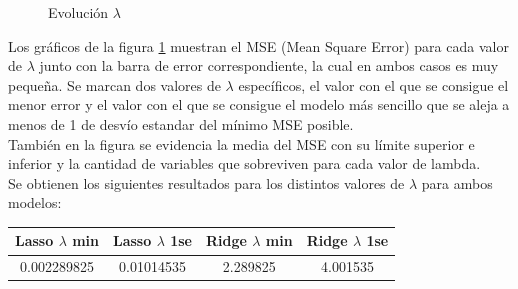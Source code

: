 \newpage

\begin{figure}[h]
\centering
{}%
\hspace{0.25cm}%
\caption{Evolución $\lambda$}
\label{lambda}
\end{figure}



Los gráficos de la figura \ref{lambda} muestran el MSE (Mean Square Error) para cada valor de $\lambda$ junto con la barra de error correspondiente, la cual en ambos casos es muy pequeña. Se marcan dos valores de $\lambda$ específicos, el valor con el que se consigue el menor error y el valor con el que se consigue el modelo más sencillo que se aleja a menos de 1 de desvío estandar del mínimo MSE posible. \\
También en la figura se evidencia la media del MSE con su límite superior e inferior y la cantidad de variables que sobreviven para cada valor de lambda.\\
Se obtienen los siguientes resultados para los distintos valores de $\lambda$ para ambos modelos:\\




\begin{center}
 \begin{tabular}{||c c c c||} 
 \hline
    Lasso $\lambda$ min & Lasso $\lambda$ 1se & Ridge $\lambda$ min & Ridge $\lambda$ 1se  \\ 
 \hline
    0.002289825	 & 0.01014535 & 2.289825 & 4.001535\\
 \hline
 \hline
\end{tabular}
\end{center}



